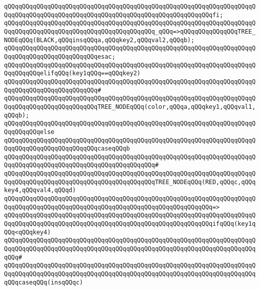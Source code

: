 \verb|qQQqqQQqqQQqqQQqqQQqqQQqqQQqqQQqqQQqqQQqqQQqqQQqqQQqqQQqqQQqqQQqqQQqqQQqqQQqqQQqqQQqqQQqqQQqqQQqqQQqqQQqqQQqqQQqqQQqqQQqqQQqqQQqfi;|\newline
\newline
\verb|qQQqqQQqqQQqqQQqqQQqqQQqqQQqqQQqqQQqqQQqqQQqqQQqqQQqqQQqqQQqqQQqqQQqqQQqqQQqqQQqqQQqqQQqqQQqqQQqqQQqqQQqqQQqqQQq_qQQq=>qQQqqQQqqQQqqQQqTREE_NODEqQQq(BLACK,qQQqinsqQQqa,qQQqkey2,qQQqval2,qQQqb);|\newline
\verb|qQQqqQQqqQQqqQQqqQQqqQQqqQQqqQQqqQQqqQQqqQQqqQQqqQQqqQQqqQQqqQQqqQQqqQQqqQQqqQQqqQQqqQQqqQQqqQQqesac;|\newline
\newline
\verb|qQQqqQQqqQQqqQQqqQQqqQQqqQQqqQQqqQQqqQQqqQQqqQQqqQQqqQQqqQQqqQQqqQQqqQQqqQQqqQQqelifqQQq(key1qQQq==qQQqkey2)|\newline
\verb|qQQqqQQqqQQqqQQqqQQqqQQqqQQqqQQqqQQqqQQqqQQqqQQqqQQqqQQqqQQqqQQqqQQqqQQqqQQqqQQqqQQqqQQqqQQqqQQq#|\newline
\verb|qQQqqQQqqQQqqQQqqQQqqQQqqQQqqQQqqQQqqQQqqQQqqQQqqQQqqQQqqQQqqQQqqQQqqQQqqQQqqQQqqQQqqQQqqQQqqQQqTREE_NODEqQQq(color,qQQqa,qQQqkey1,qQQqval1,qQQqb);|\newline
\verb|qQQqqQQqqQQqqQQqqQQqqQQqqQQqqQQqqQQqqQQqqQQqqQQqqQQqqQQqqQQqqQQqqQQqqQQqqQQqqQQqelse|\newline
\verb|qQQqqQQqqQQqqQQqqQQqqQQqqQQqqQQqqQQqqQQqqQQqqQQqqQQqqQQqqQQqqQQqqQQqqQQqqQQqqQQqqQQqqQQqqQQqqQQqcaseqQQqb|\newline
\verb|qQQqqQQqqQQqqQQqqQQqqQQqqQQqqQQqqQQqqQQqqQQqqQQqqQQqqQQqqQQqqQQqqQQqqQQqqQQqqQQqqQQqqQQqqQQqqQQqqQQqqQQqqQQqqQQq#|\newline
\verb|qQQqqQQqqQQqqQQqqQQqqQQqqQQqqQQqqQQqqQQqqQQqqQQqqQQqqQQqqQQqqQQqqQQqqQQqqQQqqQQqqQQqqQQqqQQqqQQqqQQqqQQqqQQqqQQqTREE_NODEqQQq(RED,qQQqc,qQQqkey4,qQQqval4,qQQqd)|\newline
\verb|qQQqqQQqqQQqqQQqqQQqqQQqqQQqqQQqqQQqqQQqqQQqqQQqqQQqqQQqqQQqqQQqqQQqqQQqqQQqqQQqqQQqqQQqqQQqqQQqqQQqqQQqqQQqqQQqqQQqqQQqqQQqqQQq=>|\newline
\verb|qQQqqQQqqQQqqQQqqQQqqQQqqQQqqQQqqQQqqQQqqQQqqQQqqQQqqQQqqQQqqQQqqQQqqQQqqQQqqQQqqQQqqQQqqQQqqQQqqQQqqQQqqQQqqQQqqQQqqQQqqQQqqQQqifqQQq(key1qQQq<qQQqkey4)|\newline
\verb|qQQqqQQqqQQqqQQqqQQqqQQqqQQqqQQqqQQqqQQqqQQqqQQqqQQqqQQqqQQqqQQqqQQqqQQqqQQqqQQqqQQqqQQqqQQqqQQqqQQqqQQqqQQqqQQqqQQqqQQqqQQqqQQqqQQqqQQqqQQqqQQq#|\newline
\verb|qQQqqQQqqQQqqQQqqQQqqQQqqQQqqQQqqQQqqQQqqQQqqQQqqQQqqQQqqQQqqQQqqQQqqQQqqQQqqQQqqQQqqQQqqQQqqQQqqQQqqQQqqQQqqQQqqQQqqQQqqQQqqQQqqQQqqQQqqQQqqQQqcaseqQQq(insqQQqc)|\newline

